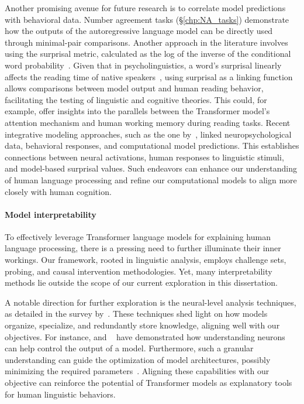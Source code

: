 Another promising avenue for future research is to correlate model predictions with behavioral data. Number agreement tasks (\S\ref{chp:NA_tasks}) demonstrate how the outputs of the autoregressive language model can be directly used through minimal-pair comparisons. Another approach in the literature involves using the surprisal metric, calculated as the log of the inverse of the conditional word probability~\citep{hale2001probabilistic,levy2008expectation}. Given that in psycholinguistics, a word's surprisal linearly affects the reading time of native speakers~\citep{goodkind2018predictive,hale2001probabilistic}, using surprisal as a linking function allows comparisons between model output and human reading behavior, facilitating the testing of linguistic and cognitive theories. This could, for example, offer insights into the parallels between the Transformer model's attention mechanism and human working memory during reading tasks. Recent integrative modeling approaches, such as the one by~\cite{schrimpf2021neural}, linked neuropsychological data, behavioral responses, and computational model predictions. This establishes connections between neural activations, human responses to linguistic stimuli, and model-based surprisal values. Such endeavors can enhance our understanding of human language processing and refine our computational models to align more closely with human cognition.


\paragraph{Model interpretability} 
To effectively leverage Transformer language models for explaining human language processing, there is a pressing need to further illuminate their inner workings. Our framework, rooted in linguistic analysis, employs challenge sets, probing, and causal intervention methodologies. Yet, many interpretability methods lie outside the scope of our current exploration in this dissertation. 

A notable direction for further exploration is the neural-level analysis techniques, as detailed in the survey by~\cite{sajjad-etal-2022-neuron}. These techniques shed light on how models organize, specialize, and redundantly store knowledge, aligning well with our objectives. For instance, \cite{bau2018identifying} and ~\cite{dai-etal-2022-knowledge} have demonstrated how understanding neurons can help control the output of a model. Furthermore, such a granular understanding can guide the optimization of model architectures, possibly minimizing the required parameters~\citep{voita-etal-2019-analyzing,sajjad2004poor,dalvi-etal-2020-analyzing}. Aligning these capabilities with our objective can reinforce the potential of Transformer models as explanatory tools for human linguistic behaviors.

